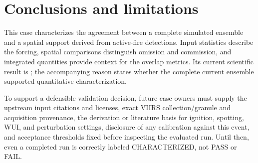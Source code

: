 \section{Conclusions and limitations}

This case characterizes the agreement between a complete simulated ensemble
and a spatial support derived from active-fire detections. Input statistics
describe the forcing, spatial comparisons distinguish omission and commission,
and integrated quantities provide context for the overlap metrics.  Its current
scientific result is \textbf{}; the accompanying reason states
whether the complete current ensemble supported quantitative characterization.

To support a defensible validation decision, future case owners must supply the
upstream input citations and licenses, exact VIIRS collection/granule and
acquisition provenance, the derivation or literature basis for ignition,
spotting, WUI, and perturbation settings, disclosure of any calibration against
this event, and acceptance thresholds fixed before inspecting the evaluated
run.  Until then, even a completed run is correctly labeled CHARACTERIZED, not
PASS or FAIL.
